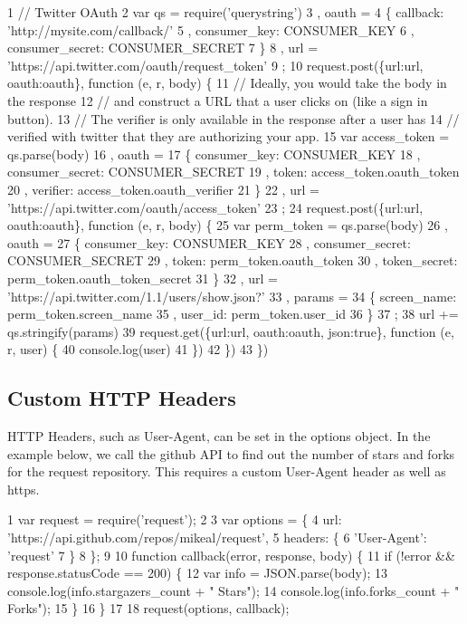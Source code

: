 \begin{DoxyCode}
1 // Twitter OAuth
2 var qs = require('querystring')
3   , oauth =
4     \{ callback: 'http://mysite.com/callback/'
5     , consumer\_key: CONSUMER\_KEY
6     , consumer\_secret: CONSUMER\_SECRET
7     \}
8   , url = 'https://api.twitter.com/oauth/request\_token'
9   ;
10 request.post(\{url:url, oauth:oauth\}, function (e, r, body) \{
11   // Ideally, you would take the body in the response
12   // and construct a URL that a user clicks on (like a sign in button).
13   // The verifier is only available in the response after a user has
14   // verified with twitter that they are authorizing your app.
15   var access\_token = qs.parse(body)
16     , oauth =
17       \{ consumer\_key: CONSUMER\_KEY
18       , consumer\_secret: CONSUMER\_SECRET
19       , token: access\_token.oauth\_token
20       , verifier: access\_token.oauth\_verifier
21       \}
22     , url = 'https://api.twitter.com/oauth/access\_token'
23     ;
24   request.post(\{url:url, oauth:oauth\}, function (e, r, body) \{
25     var perm\_token = qs.parse(body)
26       , oauth =
27         \{ consumer\_key: CONSUMER\_KEY
28         , consumer\_secret: CONSUMER\_SECRET
29         , token: perm\_token.oauth\_token
30         , token\_secret: perm\_token.oauth\_token\_secret
31         \}
32       , url = 'https://api.twitter.com/1.1/users/show.json?'
33       , params =
34         \{ screen\_name: perm\_token.screen\_name
35         , user\_id: perm\_token.user\_id
36         \}
37       ;
38     url += qs.stringify(params)
39     request.get(\{url:url, oauth:oauth, json:true\}, function (e, r, user) \{
40       console.log(user)
41     \})
42   \})
43 \})
\end{DoxyCode}


\subsection*{Custom H\+T\+T\+P Headers}

H\+T\+T\+P Headers, such as {\ttfamily User-\/\+Agent}, can be set in the {\ttfamily options} object. In the example below, we call the github A\+P\+I to find out the number of stars and forks for the request repository. This requires a custom {\ttfamily User-\/\+Agent} header as well as https.


\begin{DoxyCode}
1 var request = require('request');
2 
3 var options = \{
4     url: 'https://api.github.com/repos/mikeal/request',
5     headers: \{
6         'User-Agent': 'request'
7     \}
8 \};
9 
10 function callback(error, response, body) \{
11     if (!error && response.statusCode == 200) \{
12         var info = JSON.parse(body);
13         console.log(info.stargazers\_count + " Stars");
14         console.log(info.forks\_count + " Forks");
15     \}
16 \}
17 
18 request(options, callback);
\end{DoxyCode}


